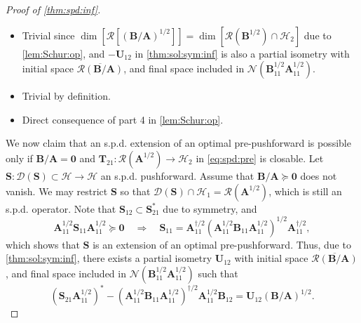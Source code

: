 \documentclass[noinfoline]{imsart}\setcounter{tocdepth}{2}
\newcommand{\m}[1]{\mathbf{#1}} %
\renewcommand{\c}[1]{\mathcal{#1}} %
\theoremstyle{plain}
\begin{document}
\begin{proof}[Proof of \cref{thm:spd:inf}] \quad
\begin{itemize}[leftmargin = *]
\item [($1 \Leftrightarrow 2)$] Trivial since $\dim[\c{R} [(\m{B}/\m{A})^{1/2}]] = \dim [\c{R}(\m{B}^{1/2}) \cap \c{H}_{2}]$ due to \cref{lem:Schur:op}, and $- \m{U}_{12}$ in \cref{thm:sol:sym:inf} is also a partial isometry with initial space $\overline{\c{R}(\m{B}/\m{A})}$, and final space included in $\c{N}(\m{B}_{11}^{1/2} \m{A}_{11}^{1/2})$.
\item [($3 \Leftrightarrow 4)$] Trivial by definition.
\item [($2 \Leftrightarrow 4)$] Direct consequence of part 4 in \cref{lem:Schur:op}.
\end{itemize}

We now claim that an s.p.d. extension of an optimal pre-pushforward is possible only if $\m{B}/\m{A} = \m{0}$ and $\m{T}_{21}: \c{R}(\m{A}^{1/2}) \to \c{H}_{2}$ in \eqref{eq:spd:pre} is closable.
Let $\m{S} : \c{D}(\m{S}) \subset \c{H} \to \c{H}$ an s.p.d. pushforward. Assume that $\m{B}/\m{A} \succeq \m{0}$ does not vanish. We may restrict $\m{S}$ so that $\c{D}(\m{S}) \cap \c{H}_{1} = \c{R}(\m{A}^{1/2})$, which is still an s.p.d. operator. Note that $\m{S}_{12} \subset \m{S}_{21}^{*}$ due to symmetry, and
\begin{equation*}
    \m{A}_{11}^{1/2} \m{S}_{11} \m{A}_{11}^{1/2} \succeq \m{0} \quad \Rightarrow \quad \m{S}_{11}= \m{A}_{11}^{\dagger/2} (\m{A}_{11}^{1/2} \m{B}_{11} \m{A}_{11}^{1/2})^{1/2} \m{A}_{11}^{\dagger/2},
\end{equation*}
which shows that $\m{S}$ is an extension of an optimal pre-pushforward. Thus, due to \cref{thm:sol:sym:inf}, there exists a partial isometry $\m{U}_{12}$ with initial space $\overline{\c{R}(\m{B}/\m{A})}$, and final space included in $\c{N}(\m{B}_{11}^{1/2} \m{A}_{11}^{1/2})$ such that
\begin{equation}\label{eq:spd:prdx}
    (\m{S}_{21} \m{A}_{11}^{1/2})^{*} - (\m{A}_{11}^{1/2} \m{B}_{11} \m{A}_{11}^{1/2})^{\dagger/2} \m{A}_{11}^{1/2} \m{B}_{12} = \m{U}_{12} (\m{B}/\m{A})^{1/2}.
\end{equation}



\end{proof}
\end{document}
